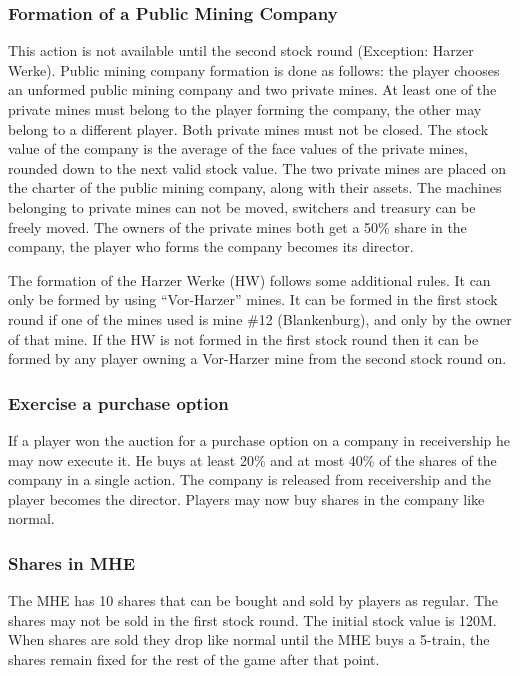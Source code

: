 \documentclass[a4paper,twocolumn]{article}
\begin{document}
\subsubsection{Formation of a Public Mining Company}
This action is not available until the second stock round (Exception: Harzer
Werke). Public mining company formation is done as follows: the player chooses
an unformed public mining company and two private mines. At least one of the
private mines must belong to the player forming the company, the other may
belong to a different player. Both private mines must not be closed. The stock
value of the company is the average of the face values of the private mines,
rounded down to the next valid stock value. The two private mines are placed on
the charter of the public mining company, along with their assets. The machines
belonging to private mines can not be moved, switchers and treasury can be
freely moved. The owners of the private mines both get a 50\% share in the
company, the player who forms the company becomes its director.

The formation of the Harzer Werke (HW) follows some additional rules. It can
only be formed by using ``Vor-Harzer'' mines. It can be formed in the first
stock round if one of the mines used is mine \#12 (Blankenburg), and only by the
owner of that mine. If the HW is not formed in the first stock round then it can
be formed by any player owning a Vor-Harzer mine from the second stock round on.

\subsubsection{Exercise a purchase option}
If a player won the auction for a purchase option on a company in receivership
he may now execute it. He buys at least 20\% and at most 40\% of the shares of
the company in a single action. The company is released from receivership and
the player becomes the director. Players may now buy shares in the company like
normal.

\subsubsection{Shares in MHE}
The MHE has 10 shares that can be bought and sold by players as regular. The
shares may not be sold in the first stock round. The initial stock value is
120M. When shares are sold they drop like normal until the MHE buys a 5-train,
the shares remain fixed for the rest of the game after that point.
\end{document}
